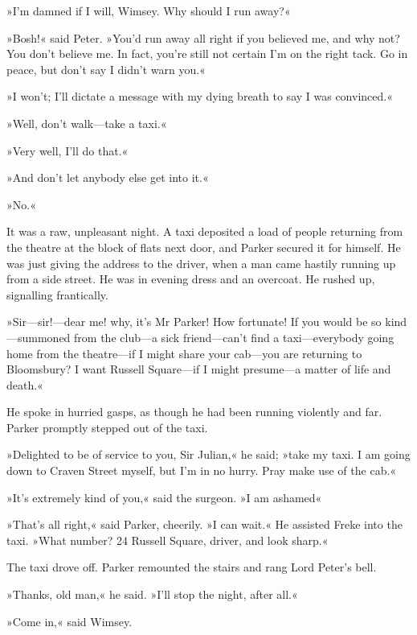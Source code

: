 »I'm damned if I will, Wimsey. Why should I run away?«

»Bosh!« said Peter. »You'd run away all right if you believed me, and why not? You don't believe me. In fact, you're still not certain I'm on the right tack. Go in peace, but don't say I didn't warn you.«

»I won't; I'll dictate a message with my dying breath to say I was convinced.«

»Well, don't walk\allowbreak---\allowbreak take a taxi.«

»Very well, I'll do that.«

»And don't let anybody else get into it.«

»No.«

It was a raw, unpleasant night. A taxi deposited a load of people returning from the theatre at the block of flats next door, and Parker secured it for himself. He was just giving the address to the driver, when a man came hastily running up from a side street. He was in evening dress and an overcoat. He rushed up, signalling frantically.

»Sir\allowbreak---\allowbreak sir!---dear me! why, it's Mr Parker! How fortunate! If you would be so kind\allowbreak---\allowbreak summoned from the club\allowbreak---\allowbreak a sick friend\allowbreak---\allowbreak can't find a taxi\allowbreak---\allowbreak everybody going home from the theatre\allowbreak---\allowbreak if I might share your cab\allowbreak---\allowbreak you are returning to Bloomsbury? I want Russell Square\allowbreak---\allowbreak if I might presume\allowbreak---\allowbreak a matter of life and death.«

He spoke in hurried gasps, as though he had been running violently and far. Parker promptly stepped out of the taxi.

»Delighted to be of service to you, Sir Julian,« he said; »take my taxi. I am going down to Craven Street myself, but I'm in no hurry. Pray make use of the cab.«

»It's extremely kind of you,« said the surgeon. »I am ashamed\longdash«

»That's all right,« said Parker, cheerily. »I can wait.« He assisted Freke into the taxi. »What number? 24 Russell Square, driver, and look sharp.«

The taxi drove off. Parker remounted the stairs and rang Lord Peter's bell.

»Thanks, old man,« he said. »I'll stop the night, after all.«

»Come in,« said Wimsey.

